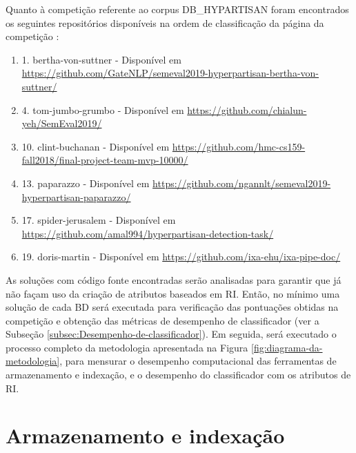     Quanto à competição referente ao corpus DB\_HYPARTISAN foram encontrados os seguintes repositórios disponíveis na ordem de classificação da página da competição \cite{PAN_HND_2019}:
    \begin{enumerate}[label=\Roman*.]
        \item 1. bertha-von-suttner - Disponível em \url{https://github.com/GateNLP/semeval2019-hyperpartisan-bertha-von-suttner/}
        
        \item 4. tom-jumbo-grumbo - Disponível em \url{https://github.com/chialun-yeh/SemEval2019/}
        
        \item 10. clint-buchanan - Disponível em \url{https://github.com/hmc-cs159-fall2018/final-project-team-mvp-10000/}
        
        \item 13. paparazzo - Disponível em \url{https://github.com/ngannlt/semeval2019-hyperpartisan-paparazzo/}
        
        \item 17. spider-jerusalem - Disponível em \url{https://github.com/amal994/hyperpartisan-detection-task/}
        
        \item 19. doris-martin - Disponível em \url{https://github.com/ixa-ehu/ixa-pipe-doc/}
    \end{enumerate}

    As soluções com código fonte encontradas serão analisadas para garantir que já não façam uso da criação de atributos baseados em RI.
    Então, no mínimo uma solução de cada BD será executada para verificação das pontuações obtidas na competição e obtenção das métricas de desempenho de classificador (ver a Subseção \ref{subsec:Desempenho-de-classificador}).
    Em seguida, será executado o processo completo da metodologia apresentada na Figura \ref{fig:diagrama-da-metodologia}, para mensurar o desempenho computacional das ferramentas de armazenamento e indexação, e o desempenho do classificador com os atributos de RI.
    
    
\section{Armazenamento e indexação} \label{sec:Armazenamento-e-indexação}

